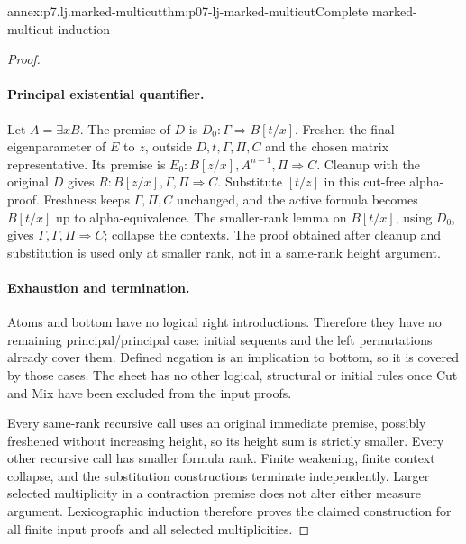\begin{annexitem}{annex:p7.lj.marked-multicut}{thm:p07-lj-marked-multicut}{Complete marked-multicut induction}
\begin{proof}
\paragraph{Principal existential quantifier.}
Let \(A=\exists xB\).  The premise of \(D\) is
\(D_0:\Gamma\Rightarrow B[t/x]\).  Freshen the final
eigenparameter of \(E\) to \(z\), outside \(D,t,\Gamma,\Pi,C\)
and the chosen matrix representative.  Its premise is
\(E_0:B[z/x],A^{n-1},\Pi\Rightarrow C\).
Cleanup with the original \(D\) gives
\(R:B[z/x],\Gamma,\Pi\Rightarrow C\).
Substitute \([t/z]\) in this cut-free alpha-proof.  Freshness keeps
\(\Gamma,\Pi,C\) unchanged, and the active formula becomes
\(B[t/x]\) up to alpha-equivalence.  The smaller-rank lemma on
\(B[t/x]\), using \(D_0\), gives
\(\Gamma,\Gamma,\Pi\Rightarrow C\); collapse the contexts.
The proof obtained after cleanup and substitution is used only at
smaller rank, not in a same-rank height argument.

\paragraph{Exhaustion and termination.}
Atoms and bottom have no logical right introductions.  Therefore they
have no remaining principal/principal case: initial sequents and the
left permutations already cover them.  Defined negation is an
implication to bottom, so it is covered by those cases.  The sheet has
no other logical, structural or initial rules once Cut and Mix have
been excluded from the input proofs.

Every same-rank recursive call uses an original immediate premise,
possibly freshened without increasing height, so its height sum is
strictly smaller.  Every other recursive call has smaller formula
rank.  Finite weakening, finite context collapse, and the substitution
constructions terminate independently.  Larger selected multiplicity
in a contraction premise does not alter either measure argument.
Lexicographic induction therefore proves the claimed construction for
all finite input proofs and all selected multiplicities.
\end{proof}
\end{annexitem}

